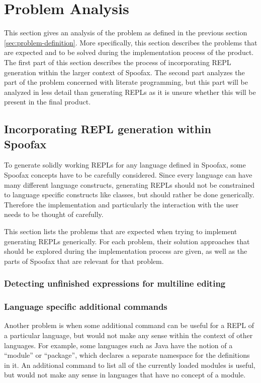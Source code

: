 \section{Problem Analysis}
\label{sec:problem-analysis}
This section gives an analysis of the problem as defined in the
previous section \ref{sec:problem-definition}. More specifically, this
section describes the problems that are expected and to be solved
during the implementation process of the product. The first part of
this section describes the process of incorporating REPL generation
within the larger context of Spoofax. The second part analyzes the
part of the problem concerned with literate programming, but this part
will be analyzed in less detail than generating REPLs as it is unsure
whether this will be present in the final product.

\subsection{Incorporating REPL generation within Spoofax}
\label{ssec:incorp-repl-gener}
To generate solidly working REPLs for any language defined in Spoofax,
some Spoofax concepts have to be carefully considered. Since every
language can have many different language constructs, generating REPLs
should not be constrained to language specific constructs like
classes, but should rather be done generically. Therefore the
implementation and particularly the interaction with the user needs to
be thought of carefully.

This section lists the problems that are expected when trying to
implement generating REPLs generically. For each problem, their
solution approaches that should be explored during the implementation
process are given, as well as the parts of Spoofax that are relevant
for that problem.

\subsubsection{Detecting unfinished expressions for multiline editing}
\label{sec:detect-unfin-expr}

\subsubsection{Language specific additional commands}
\label{sec:lang-spec-addit}
Another problem is when some additional command can be useful for a
REPL of a particular language, but would not make any sense within the
context of other languages. For example, some languages such as Java
have the notion of a ``module'' or ``package'', which declares a
separate namespace for the definitions in it. An additional command to
list all of the currently loaded modules is useful, but would not make
any sense in languages that have no concept of a module.

